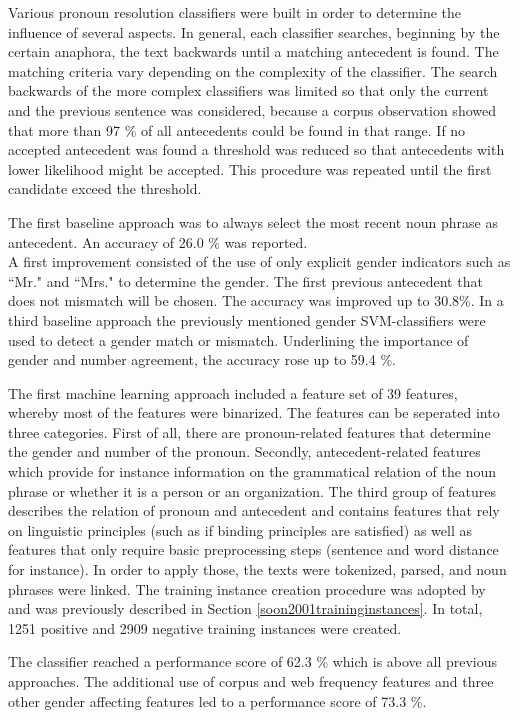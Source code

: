 Various pronoun resolution classifiers were built in order to determine the influence of several aspects. In general, each classifier searches, beginning by the certain anaphora, the text backwards until a matching antecedent is found. The matching criteria vary depending on the complexity of the classifier. The search backwards of the more complex classifiers was limited so that only the current and the previous sentence was considered, because a corpus observation showed that more than 97 \% of all antecedents could be found in that range. If no accepted antecedent was found a threshold was reduced so that antecedents with lower likelihood might be accepted. This procedure was repeated until the first candidate exceed the threshold. 

The first baseline approach was to always select the most recent noun phrase as antecedent. An accuracy of 26.0 \% was reported. \\
A first improvement consisted of the use of only explicit gender indicators such as “Mr." and “Mrs." to determine the gender. The first previous antecedent that does not mismatch will be chosen. The accuracy was improved up to 30.8\%. 
In a third baseline approach the previously mentioned gender SVM-classifiers were used to detect a gender match or mismatch. Underlining the importance of gender and number agreement, the accuracy rose up to 59.4 \%.

The first machine learning approach included a feature set of 39 features, whereby most of the features were binarized. The features can be seperated into three categories. First of all, there are pronoun-related features that determine the gender and number of the pronoun. Secondly, antecedent-related features which provide for instance information on the grammatical relation of the noun phrase or whether it is a person or an organization. The third group of features describes the relation of pronoun and antecedent and contains features that rely on linguistic principles (such as if binding principles are satisfied) as well as features that only require basic preprocessing steps (sentence and word distance for instance). In order to apply those, the texts were tokenized, parsed, and noun phrases were linked. The training instance creation procedure was adopted by \cite{soon2001machine} and was previously described in Section \ref{soon2001traininginstances}. In total, 1251 positive and 2909 negative training instances were created. 

The classifier reached a performance score of 62.3 \% which is above all previous approaches. The additional use of corpus and web frequency features and three other gender affecting features led to a performance score of 73.3 \%. 


